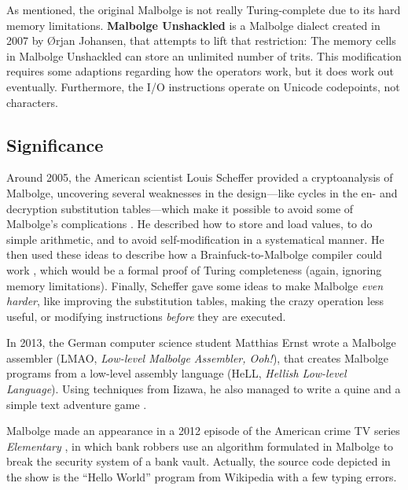 As mentioned, the original Malbolge is not really Turing-complete due to its hard memory limitations. \textbf{Malbolge Unshackled} is a Malbolge dialect created in 2007 by Ørjan Johansen, that attempts to lift that restriction: The memory cells in Malbolge Unshackled can store an unlimited number of trits. This modification requires some adaptions regarding how the operators work, but it does work out eventually. Furthermore, the I/O instructions operate on Unicode codepoints, not \ascii{} characters.

\subsection{Significance}

Around 2005, the American scientist Louis Scheffer provided a cryptoanalysis of Malbolge, uncovering several weaknesses in the design---like cycles in the en- and decryption substitution tables---which make it possible to avoid some of Malbolge's complications \cite{scheffer_introduction}. He described how to store and load values, to do simple arithmetic, and to avoid self-modification in a systematical manner. He then used these ideas to describe how a Brainfuck-to-Malbolge compiler could work \cite{scheffer_writing}, which would be a formal proof of Turing completeness (again, ignoring memory limitations). Finally, Scheffer gave some ideas to make Malbolge \emph{even harder}, like improving the substitution tables, making the crazy operation less useful, or modifying instructions \emph{before} they are executed.

In 2013, the German computer science student Matthias Ernst wrote a Malbolge assembler (LMAO, \emph{Low-level Malbolge Assembler, Ooh!}), that creates Malbolge programs from a low-level assembly language (HeLL, \emph{Hellish Low-level Language}). Using techniques from Iizawa, he also managed to write a quine and a simple text adventure game \cite{ernst_malbolge}.

Malbolge made an appearance in a 2012 episode of the American crime TV series \emph{Elementary} \cite{hamilton2012esoteric}, in which bank robbers use an algorithm formulated in Malbolge to break the security system of a bank vault. Actually, the source code depicted in the show is the “Hello World” program from Wikipedia with a few typing errors.
